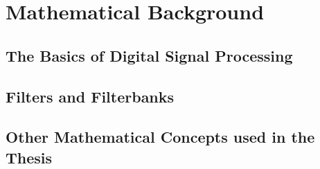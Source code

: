 \chapter{Mathematical Background}\label{chapter:math}


\section{The Basics of Digital Signal Processing}

\section{Filters and Filterbanks}

\section{Other Mathematical Concepts used in the Thesis}
